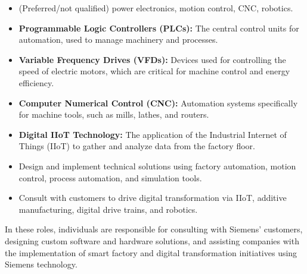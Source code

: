 \documentclass[11pt]{article}
\begin{document}
\begin{itemize}
  \item (Preferred/not qualified) power electronics, motion control, CNC, robotics.
  \item \textbf{Programmable Logic Controllers (PLCs):} The central control units for automation, used to manage machinery and processes.
  \item \textbf{Variable Frequency Drives (VFDs):} Devices used for controlling the speed of electric motors, which are critical for machine control and energy efficiency.
  \item \textbf{Computer Numerical Control (CNC):} Automation systems specifically for machine tools, such as mills, lathes, and routers.
  \item \textbf{Digital IIoT Technology:} The application of the Industrial Internet of Things (IIoT) to gather and analyze data from the factory floor.
  \item Design and implement technical solutions using factory automation, motion control, process automation, and simulation tools.
  \item Consult with customers to drive digital transformation via IIoT, additive manufacturing, digital drive trains, and robotics.
\end{itemize}

In these roles, individuals are responsible for consulting with Siemens' customers, designing custom software and hardware solutions, and assisting companies with the implementation of smart factory and digital transformation initiatives using Siemens technology.
\end{document}
